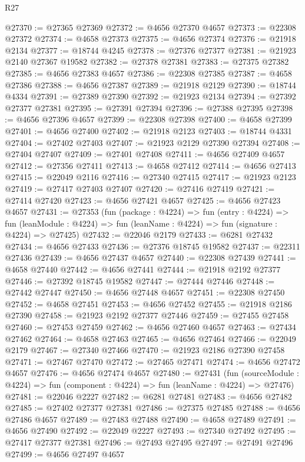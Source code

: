 \begin{lexlean}{R27}
\begin{coremodule}
@27370 := @27365 @27369
@27372 := @4656 @27370 @4657
@27373 := @22308 @27372
@27374 := @4658 @27373
@27375 := @4656 @27374
@27376 := @21918 @2134
@27377 := @18744 @4245
@27378 := @27376 @27377
@27381 := @21923 @2140 @27367 @19582
@27382 := @27378 @27381
@27383 := @27375 @27382
@27385 := @4656 @27383 @4657
@27386 := @22308 @27385
@27387 := @4658 @27386
@27388 := @4656 @27387
@27389 := @21918 @2129
@27390 := @18744 @4334
@27391 := @27389 @27390
@27392 := @21923 @2134
@27394 := @27392 @27377 @27381
@27395 := @27391 @27394
@27396 := @27388 @27395
@27398 := @4656 @27396 @4657
@27399 := @22308 @27398
@27400 := @4658 @27399
@27401 := @4656 @27400
@27402 := @21918 @2123
@27403 := @18744 @4331
@27404 := @27402 @27403
@27407 := @21923 @2129 @27390 @27394
@27408 := @27404 @27407
@27409 := @27401 @27408
@27411 := @4656 @27409 @4657
@27412 := @27356 @27411
@27413 := @4658 @27412
@27414 := @4656 @27413
@27415 := @22049 @2116
@27416 := @27340 @27415
@27417 := @21923 @2123
@27419 := @27417 @27403 @27407
@27420 := @27416 @27419
@27421 := @27414 @27420
@27423 := @4656 @27421 @4657
@27425 := @4656 @27423 @4657
@27431 := @27353
    (fun (package : @4224) =>
    fun (entry : @4224) =>
    fun (leanModule : @4224) => fun (leanName : @4224) => fun (signature : @4224) => @27425)
@27432 := @22046 @2179
@27433 := @6281 @27432
@27434 := @4656 @27433
@27436 := @27376 @18745 @19582
@27437 := @22311 @27436
@27439 := @4656 @27437 @4657
@27440 := @22308 @27439
@27441 := @4658 @27440
@27442 := @4656 @27441
@27444 := @21918 @2192 @27377
@27446 := @27392 @18745 @19582
@27447 := @27444 @27446
@27448 := @27442 @27447
@27450 := @4656 @27448 @4657
@27451 := @22308 @27450
@27452 := @4658 @27451
@27453 := @4656 @27452
@27455 := @21918 @2186 @27390
@27458 := @21923 @2192 @27377 @27446
@27459 := @27455 @27458
@27460 := @27453 @27459
@27462 := @4656 @27460 @4657
@27463 := @27434 @27462
@27464 := @4658 @27463
@27465 := @4656 @27464
@27466 := @22049 @2179
@27467 := @27340 @27466
@27470 := @21923 @2186 @27390 @27458
@27471 := @27467 @27470
@27472 := @27465 @27471
@27474 := @4656 @27472 @4657
@27476 := @4656 @27474 @4657
@27480 := @27431
    (fun (sourceModule : @4224) => fun (component : @4224) => fun (leanName : @4224) => @27476)
@27481 := @22046 @2227
@27482 := @6281 @27481
@27483 := @4656 @27482
@27485 := @27402 @27377 @27381
@27486 := @27375 @27485
@27488 := @4656 @27486 @4657
@27489 := @27483 @27488
@27490 := @4658 @27489
@27491 := @4656 @27490
@27492 := @22049 @2227
@27493 := @27340 @27492
@27495 := @27417 @27377 @27381
@27496 := @27493 @27495
@27497 := @27491 @27496
@27499 := @4656 @27497 @4657

\end{coremodule}
\end{lexlean}
